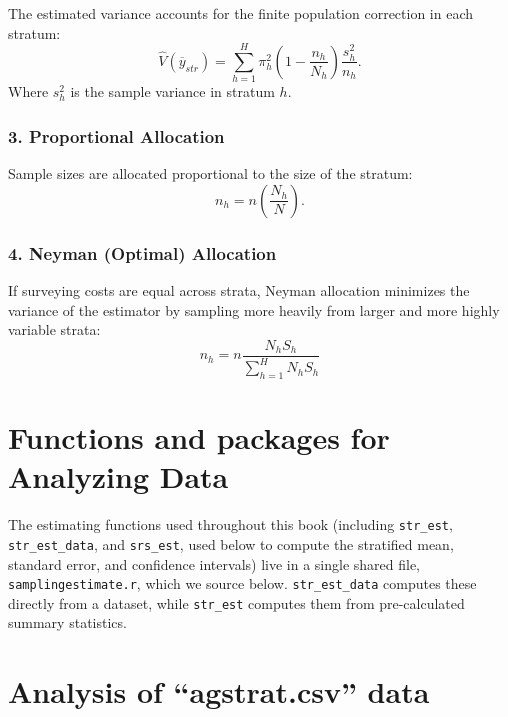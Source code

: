 \documentclass[
  letterpaper,
  DIV=11,
  numbers=noendperiod]{scrreprt}
\let\oldrule\rule
\renewcommand{\rule}[2]{%
  \ifdim#1=0.5\linewidth
    \hrule %
  \else
    \oldrule{#1}{#2} %
  \fi
}
\renewcommand{\[}{\begin{equation}}
\renewcommand{\]}{\end{equation}}
\begin{document}
The estimated variance accounts for the finite population correction in
each stratum: \[
\hat{V}(\overline{y}_{str}) = \sum_{h=1}^H \pi_h^2 \left(1 - \frac{n_h}{N_h}\right) \frac{s_h^2}{n_h}.
\] Where \(s_h^2\) is the sample variance in stratum \(h\).

\subsubsection*{3. Proportional
Allocation}\label{proportional-allocation}

Sample sizes are allocated proportional to the size of the stratum: \[
n_h = n \left( \frac{N_h}{N} \right).
\]

\subsubsection*{4. Neyman (Optimal)
Allocation}\label{neyman-optimal-allocation}

If surveying costs are equal across strata, Neyman allocation minimizes
the variance of the estimator by sampling more heavily from larger and
more highly variable strata: \[
n_h = n \frac{N_h S_h}{\sum_{h=1}^H N_h S_h}
\]

\begin{center}\rule{0.5\linewidth}{0.5pt}\end{center}

\section{Functions and packages for Analyzing
Data}\label{functions-and-packages-for-analyzing-data}

The estimating functions used throughout this book (including
\texttt{str\_est}, \texttt{str\_est\_data}, and \texttt{srs\_est}, used
below to compute the stratified mean, standard error, and confidence
intervals) live in a single shared file, \texttt{samplingestimate.r},
which we source below. \texttt{str\_est\_data} computes these directly
from a dataset, while \texttt{str\_est} computes them from
pre-calculated summary statistics.

\section{Analysis of ``agstrat.csv''
data}\label{analysis-of-agstrat.csv-data}
\end{document}
